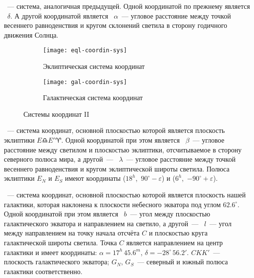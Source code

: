 ~--- система, аналогичная предыдущей. Одной координатой по прежнему является ~$\delta$. А другой координатой является ~$\alpha$~--- угловое расстояние между точкой весеннего равноденствия и кругом склонений светила в сторону годичного движения Солнца.

\begin{figure}[!h]
\centering
	\begin{subfigure}{0.49\textwidth}
		\texttt{[image: eql-coordin-sys]}
		\caption{Эклиптическая система координат}
	 \end{subfigure}
	 \hfill
	\begin{subfigure}{0.49\textwidth}
		\texttt{[image: gal-coordin-sys]}
		\caption{Галактическая система координат}
	 \end{subfigure}
	\caption{Системы координат II}
\end{figure}
~--- система координат, основной плоскостью которой является плоскость эклиптики $E \libra E' \aries $. Одной координатой при этом является ~$\beta$~--- угловое расстояние между светилом и плоскостью эклиптики, отсчитываемое в сторону северного полюса мира, а другой~--- ~$\lambda$~--- угловое расстояние между точкой весеннего равноденствия и кругом эклиптической широты светила. Полюса эклиптики $E_N$ и $E_S$ имеют координаты ($18^h$,~$90^\circ - \varepsilon$) и ($6^h$,~$-90^\circ + \varepsilon$).

~--- система координат, основной плоскостью которой является плоскость нашей галактики, которая наклонена к плоскости небесного экватора под углом $62.6^\circ$. Одной координатой при этом является ~$b$~--- угол между плоскостью галактического экватора и направлением на светило, а другой~--- ~$l$~--- угол между направлением на точку начала отсчёта $C$ и плоскостью круга галактической широты светила. Точка $C$ является направлением на центр галактики и имеет координаты: $\alpha=17^h\,45.6^m$, $\delta=-28^{\circ}\,56.2'$. $C K K'$~--- плоскость галактического экватора; $G_N$, $G_S$~--- северный и южный полюса галактики соответственно.